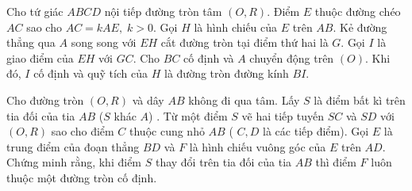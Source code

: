 \begin{bt}
	Cho tứ giác $ ABCD $ nội tiếp đường tròn tâm $ (O,R) $. Điểm $ E $ thuộc đường chéo $ AC $ sao cho $ AC=kAE,\; k>0 $. Gọi $ H $ là hình chiếu của $ E $ trên $ AB $. Kẻ đường thẳng qua $ A $ song song với $ EH $ cắt đường tròn tại điểm thứ hai là $ G $. Gọi $ I $ là giao điểm của $ EH $ với $ GC $. Cho $ BC $ cố định và $ A $ chuyển động trên $ (O) $. Khi đó, $ I $ cố định và quỹ tích của $ H $ là đường tròn đường kính $ BI $.
\end{bt}

\begin{bt}%
	Cho đường tròn $ (O, R)  $ và dây $ AB $ không đi qua tâm. Lấy $ S $ là điểm bất kì trên tia đối của tia $ AB $ ($ S $ khác $ A $) . Từ một điểm $ S $ vẽ hai tiếp tuyến $ SC $ và $ SD  $ với $ (O,R) $ sao cho điểm $ C $ thuộc cung nhỏ $ AB $ ( $ C, D $ là các tiếp điểm).	Gọi $ E $ là trung điểm của đoạn thẳng $ BD $ và $ F $ là hình chiếu vuông góc của $ E $ trên $ AD $. Chứng minh rằng, khi điểm $ S $ thay đổi trên tia đối của tia $ AB $ thì điểm $ F $ luôn thuộc một đường tròn cố định.
\end{bt}
